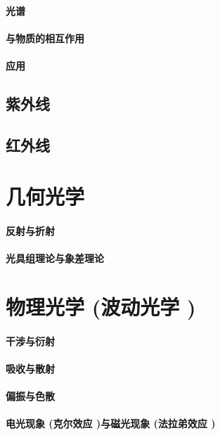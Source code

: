 \documentclass[UTF8]{../06-Physics}
\begin{document}
    \subsubsection{光谱}
    \subsubsection{与物质的相互作用}
    \subsubsection{应用}
\section{紫外线}
\section{红外线}





\chapter{几何光学}
    \subsubsection{反射与折射}
    \subsubsection{光具组理论与象差理论}




\chapter{物理光学 (波动光学 )}
    \subsubsection{干涉与衍射}
    \subsubsection{吸收与散射}
    \subsubsection{偏振与色散}
    \subsubsection{电光现象 (克尔效应 )与磁光现象 (法拉弟效应 )}
\end{document}
